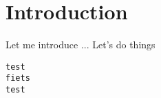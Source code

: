 \section{Introduction}
Let me introduce \cite{pica8-ocr}... Let's do things

\begin{lstlisting}
test
fiets
test
\end{lstlisting}